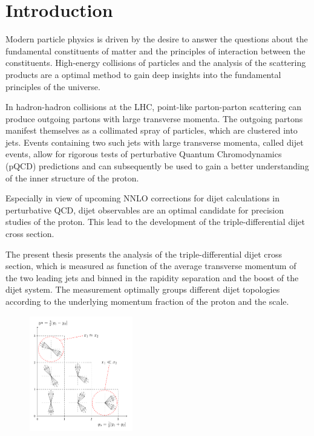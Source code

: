 
\chapter{Introduction}

Modern particle physics is driven by the desire to answer the questions about the
fundamental constituents of matter and the principles of interaction between the
constituents. High-energy collisions of particles and the analysis of the
scattering products are a optimal method to gain deep insights into the
fundamental principles of the universe. 

In hadron-hadron collisions at the LHC, point-like parton-parton scattering can
produce outgoing partons with large transverse momenta. The outgoing partons
manifest themselves as a collimated spray of particles, which are clustered into
jets. Events containing two such jets with large transverse momenta, called
dijet events, allow for rigorous tests of perturbative Quantum Chromodynamics
(pQCD) predictions and can subsequently be used to gain a better understanding
of the inner structure of the proton. 

Especially in view of upcoming NNLO corrections for dijet calculations in
perturbative QCD, dijet observables are an optimal candidate for precision
studies of the proton. This lead to the development of the triple-differential
dijet cross section. 

The present thesis presents the analysis of the triple-differential dijet cross
section, which is measured as function of the average transverse momentum of the
two leading jets and binned in the rapidity separation and the boost of the
dijet system. The measurement optimally groups different dijet topologies
according to the underlying momentum fraction of the proton and the scale.


\begin{figure}[h!]
    \centering
    \includegraphics[width=0.4\textwidth]{figures/drawings/ybys_hint.pdf}
\end{figure}

